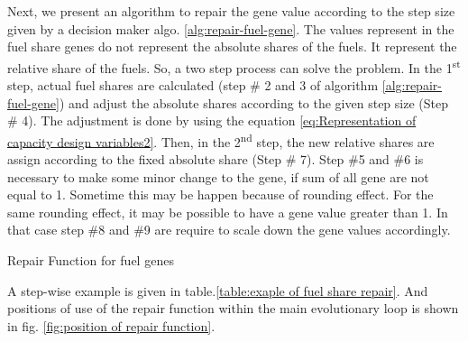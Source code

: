 \documentclass{article}
\begin{document}
Next, we present an algorithm to repair the gene value according to the step size given by a decision maker algo. \ref{alg:repair-fuel-gene}. 
The values represent in the fuel share genes do not represent the absolute shares of the fuels.
It represent the relative share of the fuels.
So, a two step process can solve the problem. 
In the 1\textsuperscript{st} step, actual fuel shares are calculated (step \# 2 and 3 of algorithm \ref{alg:repair-fuel-gene}) and  adjust the absolute shares according to the given step size (Step \# 4). 
The adjustment is done by using the equation \eqref{eq:Representation of capacity design variables2}. 
Then, in the 2\textsuperscript{nd} step, the new relative shares are assign according to the fixed absolute share (Step \# 7).
Step \#5 and \#6 is necessary to make some minor change to the gene, if sum of all gene are not equal to 1. 
Sometime this may be happen because of rounding effect. 
For the same rounding effect, it may be possible to have a gene value greater than 1.
In that case step \#8 and \#9 are require to scale down the gene values accordingly.

\begin{algorithm}
  \caption{Repair Function for fuel genes
    \label{alg:repair-fuel-gene}}
  \begin{algorithmic}[1]
%       
	\EndIf
	\EndIf 	    
	 \State {}
    \EndFunction
  \end{algorithmic}
\end{algorithm}

A step-wise example is given in table.\ref{table:exaple of fuel share repair}.
And positions of use of the repair function within the main evolutionary loop is shown in fig. \ref{fig:position of repair function}.
\end{document}
